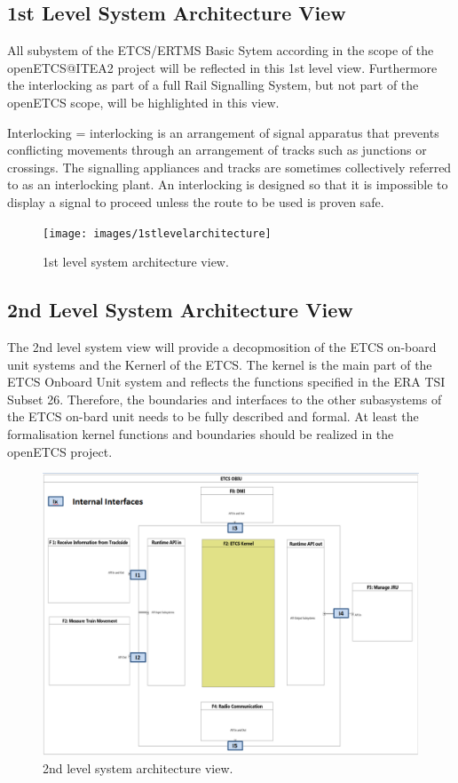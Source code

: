 \subsection{1st Level System Architecture View}
All subystem of the ETCS/ERTMS Basic Sytem according in the scope of the openETCS@ITEA2 project will be reflected in this 1st level view. Furthermore the interlocking as part of a full Rail Signalling System, but not part of the openETCS scope, will be highlighted in this view.

Interlocking =  interlocking is an arrangement of signal apparatus that prevents conflicting movements through an arrangement of tracks such as junctions or crossings. The signalling appliances and tracks are sometimes collectively referred to as an interlocking plant. An interlocking is designed so that it is impossible to display a signal to proceed unless the route to be used is proven safe.


\begin{figure}
\centering
\texttt{[image: images/1stlevelarchitecture]}
\caption{1st level system architecture view.}
\label{1st level System Architecture view}
\end{figure}

\subsection{2nd Level System Architecture View}
The 2nd level system view will provide a decopmosition of the ETCS on-board unit systems and the Kernerl of the ETCS. The kernel is the main part of the ETCS Onboard Unit system and reflects the functions specified in the ERA TSI Subset 26. Therefore, the boundaries and interfaces to the other subasystems of the ETCS on-bard unit needs to be fully described and formal. At least the formalisation kernel functions and boundaries should be realized in the openETCS project.

\begin{figure}
\centering
\includegraphics[scale=0.6]{images/2ndlevelarchitecture}
\caption{2nd level system architecture view.}
\label{2nd level System Architecture view}
\end{figure}

